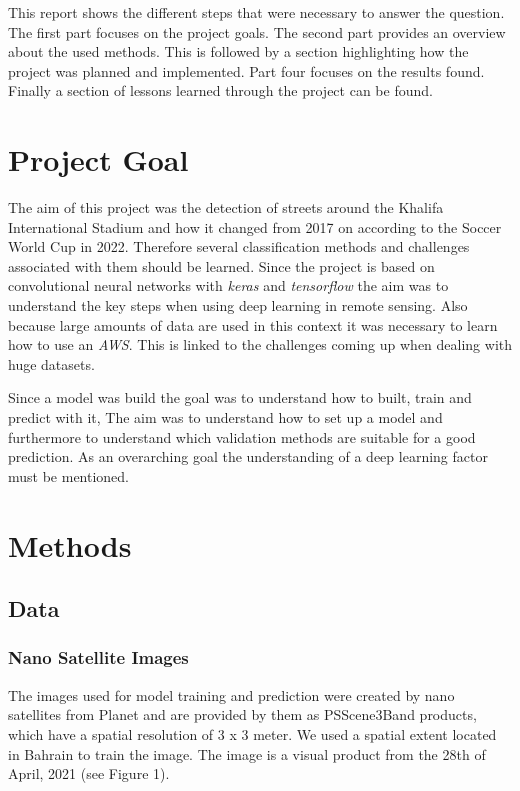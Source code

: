\documentclass[
]{article}
\begin{document}
This report shows the different steps that were necessary to answer the
question. The first part focuses on the project goals. The second part
provides an overview about the used methods. This is followed by a
section highlighting how the project was planned and implemented. Part
four focuses on the results found. Finally a section of lessons learned
through the project can be found.

\hypertarget{project-goal}{%
\section{Project Goal}\label{project-goal}}

The aim of this project was the detection of streets around the Khalifa
International Stadium and how it changed from 2017 on according to the
Soccer World Cup in 2022. Therefore several classification methods and
challenges associated with them should be learned. Since the project is
based on convolutional neural networks with \emph{keras} and
\emph{tensorflow} the aim was to understand the key steps when using
deep learning in remote sensing. Also because large amounts of data are
used in this context it was necessary to learn how to use an \emph{AWS}.
This is linked to the challenges coming up when dealing with huge
datasets.

Since a model was build the goal was to understand how to built, train
and predict with it, The aim was to understand how to set up a model and
furthermore to understand which validation methods are suitable for a
good prediction. As an overarching goal the understanding of a deep
learning factor must be mentioned.

\hypertarget{methods}{%
\section{Methods}\label{methods}}

\hypertarget{data}{%
\subsection{Data}\label{data}}

\hypertarget{nano-satellite-images}{%
\subsubsection{Nano Satellite Images}\label{nano-satellite-images}}

The images used for model training and prediction were created by nano
satellites from Planet and are provided by them as PSScene3Band
products, which have a spatial resolution of 3 x 3 meter. We used a
spatial extent located in Bahrain to train the image. The image is a
visual product from the 28th of April, 2021 (see Figure 1).
\end{document}
